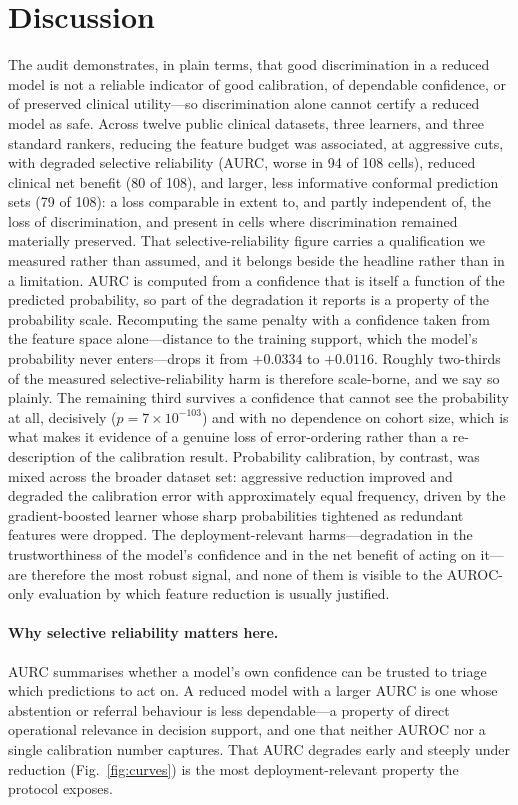 \documentclass[fleqn,10pt]{wlscirep}
\newcommand{\result}[1]{#1}
\begin{document}
\section{Discussion}
\label{sec:discussion}

The audit demonstrates, in plain terms, that good discrimination in a reduced model is not a reliable
indicator of good calibration, of dependable confidence, or of preserved clinical utility---so
discrimination alone cannot certify a reduced model as safe. Across twelve public clinical datasets, three learners,
and three standard rankers, reducing the feature budget was associated, at aggressive cuts, with
degraded selective reliability (AURC, worse in 94 of 108 cells), reduced clinical net benefit (80 of
108), and larger, less informative conformal prediction sets (79 of 108): a loss comparable in extent
to, and partly independent of, the loss of discrimination, and present in cells where discrimination
remained materially preserved. That selective-reliability figure carries a qualification we measured
rather than assumed, and it belongs beside the headline rather than in a limitation. AURC is computed
from a confidence that is itself a function of the predicted probability, so part of the degradation
it reports is a property of the probability scale. Recomputing the same penalty with a confidence
taken from the feature space alone---distance to the training support, which the model's probability
never enters---drops it from \result{$+0.0334$} to \result{$+0.0116$}. Roughly \result{two-thirds} of
the measured selective-reliability harm is therefore scale-borne, and we say so plainly. The
remaining \result{third} survives a confidence that cannot see the probability at all, decisively
(\result{$p=7\times10^{-103}$}) and with no dependence on cohort size, which is what makes it
evidence of a genuine loss of error-ordering rather than a re-description of the calibration result.
Probability calibration, by contrast, was mixed across the broader
dataset set: aggressive reduction improved and degraded the calibration error with approximately equal
frequency, driven by the gradient-boosted learner whose sharp probabilities tightened as redundant
features were dropped. The deployment-relevant harms---degradation in the trustworthiness of the
model's confidence and in the net benefit of acting on it---are therefore the most robust signal, and
none of them is visible to the AUROC-only evaluation by which feature reduction is usually justified.

\paragraph{Why selective reliability matters here.} AURC summarises whether a model's own
confidence can be trusted to triage which predictions to act on. A reduced model with a larger
AURC is one whose abstention or referral behaviour is less dependable---a property of direct
operational relevance in decision support, and one that neither AUROC nor a single calibration
number captures. That AURC degrades early and steeply under reduction (Fig.~\ref{fig:curves}) is the
most deployment-relevant property the protocol exposes.
\end{document}
